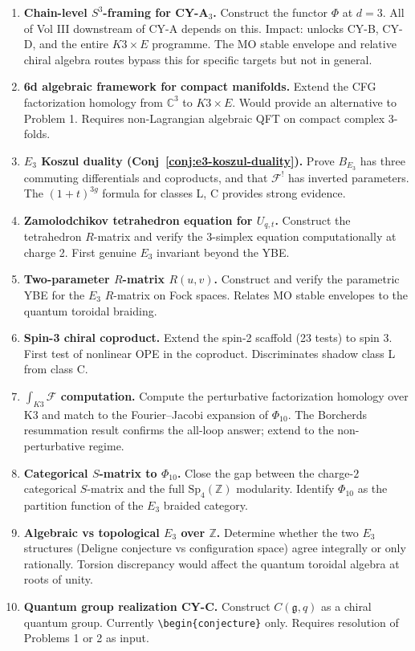 \documentclass[11pt]{article}
\newcommand{\frakg}{\mathfrak{g}}
\newcommand{\cF}{\mathcal{F}}
\newcommand{\C}{\mathbb{C}}
\newcommand{\Z}{\mathbb{Z}}
\theoremstyle{plain}
\theoremstyle{definition}
\theoremstyle{remark}
\begin{document}
\begin{enumerate}
\item \textbf{Chain-level $S^3$-framing for CY-A$_3$.}
  Construct the functor $\Phi$ at $d=3$. All of Vol III downstream of CY-A depends on this. Impact: unlocks CY-B, CY-D, and the entire $K3 \times E$ programme. The MO stable envelope and relative chiral algebra routes bypass this for specific targets but not in general.

\item \textbf{6d algebraic framework for compact manifolds.}
  Extend the CFG factorization homology from $\C^3$ to $K3 \times E$. Would provide an alternative to Problem 1. Requires non-Lagrangian algebraic QFT on compact complex 3-folds.

\item \textbf{$E_3$ Koszul duality (Conj~\ref{conj:e3-koszul-duality}).}
  Prove $B_{E_3}$ has three commuting differentials and coproducts, and that $\cF^!$ has inverted parameters. The $(1+t)^{3g}$ formula for classes L, C provides strong evidence.

\item \textbf{Zamolodchikov tetrahedron equation for $U_{q,t}$.}
  Construct the tetrahedron $R$-matrix and verify the 3-simplex equation computationally at charge 2. First genuine $E_3$ invariant beyond the YBE.

\item \textbf{Two-parameter $R$-matrix $R(u,v)$.}
  Construct and verify the parametric YBE for the $E_3$ $R$-matrix on Fock spaces. Relates MO stable envelopes to the quantum toroidal braiding.

\item \textbf{Spin-3 chiral coproduct.}
  Extend the spin-2 scaffold (23 tests) to spin 3. First test of nonlinear OPE in the coproduct. Discriminates shadow class L from class C.

\item \textbf{$\int_{K3} \cF$ computation.}
  Compute the perturbative factorization homology over K3 and match to the Fourier--Jacobi expansion of $\Phi_{10}$. The Borcherds resummation result confirms the all-loop answer; extend to the non-perturbative regime.

\item \textbf{Categorical $S$-matrix to $\Phi_{10}$.}
  Close the gap between the charge-$2$ categorical $S$-matrix and the full $\mathrm{Sp}_4(\Z)$ modularity. Identify $\Phi_{10}$ as the partition function of the $E_3$ braided category.

\item \textbf{Algebraic vs topological $E_3$ over $\Z$.}
  Determine whether the two $E_3$ structures (Deligne conjecture vs configuration space) agree integrally or only rationally. Torsion discrepancy would affect the quantum toroidal algebra at roots of unity.

\item \textbf{Quantum group realization CY-C.}
  Construct $C(\frakg,q)$ as a chiral quantum group. Currently \texttt{\textbackslash begin\{conjecture\}} only. Requires resolution of Problems 1 or 2 as input.
\end{enumerate}
\end{document}
